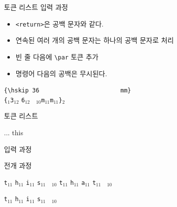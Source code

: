 \documentclass{beamer}
\begin{document}
%
\begin{frame}[fragile]{토큰 리스트}
  \alert{입력 과정}

  \begin{itemize}
  \item \verb+<return>+은 공백 문자와 같다.
  \item 연속된 여러 개의 공백 문자는 하나의 공백 문자로 처리
  \item 빈 줄 다음에 \verb+\par+ 토큰 추가
  \item 명령어 다음의 공백은 무시된다.
  \end{itemize}
  
  \verb*+{\hskip 36                       mm}+\\
  \bigskip
  \verb|{|$_1$\quad{}\quad\verb|3|$_{12}$
  \quad\verb|6|$_{12}$\quad
  \verb*| |$_{10}$\quad\verb|m|$_{11}$\quad\verb|m|$_{11}$\quad\verb|}|$_{2}$
\end{frame}


%
\begin{frame}[fragile]{토큰 리스트}
  \begin{Verbatim*}
\def\tokentwo{\iftrue this \else that \fi}
...
\tokentwo
  \end{Verbatim*}
  
  \bigskip
  \alert{입력 과정}
  
  
  \bigskip
  \alert{전개 과정}
  
  \quad
  \verb|t|$_{11}$\quad
  \verb|h|$_{11}$\quad
  \verb|i|$_{11}$\quad
  \verb|s|$_{11}$\quad
  \verb*| |$_{10}$\quad
  \quad
  \verb|t|$_{11}$\quad
  \verb|h|$_{11}$\quad
  \verb|a|$_{11}$\quad
  \verb|t|$_{11}$\quad
  \verb*| |$_{10}$\quad
  
  \bigskip
  \verb|t|$_{11}$\quad
  \verb|h|$_{11}$\quad
  \verb|i|$_{11}$\quad
  \verb|s|$_{11}$\quad
  \verb*| |$_{10}$\quad
\end{frame}
\end{document}
